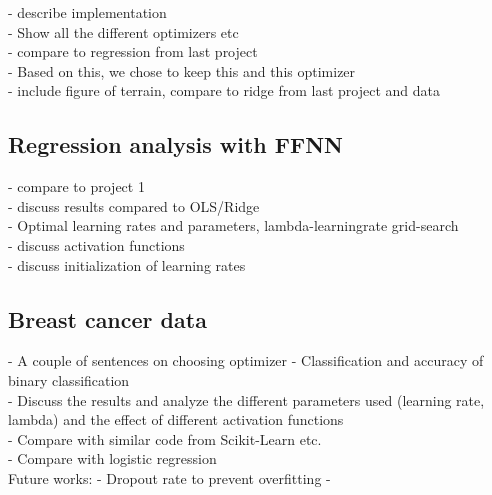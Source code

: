 - describe implementation\\
- Show all the different optimizers etc\\
- compare to regression from last project\\
- Based on this, we chose to keep this and this optimizer\\
- include figure of terrain, compare to ridge from last project and data\\



\subsection{Regression analysis with FFNN}

- compare to project 1\\
- discuss results compared to OLS/Ridge\\
- Optimal learning rates and parameters, lambda-learningrate grid-search\\
- discuss activation functions\\
- discuss initialization of learning rates\\


\subsection{Breast cancer data}
- A couple of sentences on choosing optimizer
- Classification and accuracy of binary classification\\
- Discuss the results and analyze the different parameters used (learning rate, lambda) and the effect of different activation functions\\
- Compare with similar code from Scikit-Learn etc.\\
- Compare with logistic regression\\



Future works: 
- Dropout rate to prevent overfitting
- 